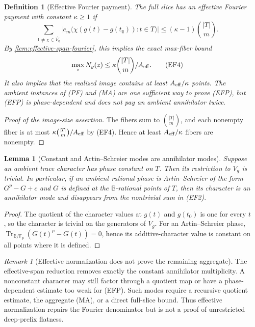 \documentclass[12pt,a4paper]{amsart}
\numberwithin{equation}{section}
\newtheorem{lemma}[lemma]{Lemma}
\newtheorem{definition}[definition]{Definition}
\theoremstyle{remark}
\newtheorem{remark}[remark]{Remark}
\DeclareMathOperator{\Tr}{Tr}
\newcommand{\F}{\mathbb F}
\newcommand{\B}{\mathbb B}
\newcommand{\abs}[1]{\lvert #1\rvert}
\begin{document}
\begin{definition}[Effective Fourier payment]
\label{def:effective-fourier-payment}
The full slice has an \emph{effective Fourier payment with constant
\(\kappa\ge1\)} if
\[
 \sum_{1\ne\chi\in\widehat{V_g}}
 \left|e_m\bigl(\chi(g(t)-g(t_0)):t\in T\bigr)\right|
 \le (\kappa-1)\binom{\abs T}m.                    \tag{EFP}
\]
By \cref{lem:effective-span-fourier}, this implies the exact max-fiber
bound
\[
               \max_zN_g(z)\le
               \kappa\binom{\abs T}m/A_{\rm eff}. \tag{EF4}
\]
It also implies that the realized image contains at least
\(A_{\rm eff}/\kappa\) points.  The ambient instances of \textup{(PF)}
and \textup{(MA)} are one sufficient way to prove \textup{(EFP)}, but
\textup{(EFP)} is phase-dependent and does not pay an ambient annihilator
twice.
\end{definition}

\begin{proof}[Proof of the image-size assertion]
The fibers sum to \(\binom{\abs T}m\), and each nonempty fiber is at most
\(\kappa\binom{\abs T}m/A_{\rm eff}\) by \textup{(EF4)}.
Hence at least \(A_{\rm eff}/\kappa\) fibers are nonempty.
\end{proof}

\begin{lemma}[Constant and Artin--Schreier modes are annihilator modes]
\label{lem:constant-modes-annihilator}
Suppose an ambient trace character has phase constant on \(T\).  Then its
restriction to \(V_g\) is trivial.  In particular, if an ambient rational
phase is Artin--Schreier of the form \(G^p-G+c\) and \(G\) is defined at
the \(\B\)-rational points of \(T\), then its character is an annihilator
mode and disappears from the nontrivial sum in \textup{(EF2)}.
\end{lemma}

\begin{proof}
The quotient of the character values at \(g(t)\) and \(g(t_0)\) is one
for every \(t\), so the character is trivial on the generators of
\(V_g\).  For an Artin--Schreier phase,
\(\Tr_{\B/\F_p}(G(t)^p-G(t))=0\), hence its additive-character value is
constant on all points where it is defined.
\end{proof}

\begin{remark}[Effective normalization does not prove the remaining aggregate]
The effective-span reduction removes exactly the constant annihilator
multiplicity.  A nonconstant character may still factor through a quotient
map or have a phase-dependent estimate too weak for \textup{(EFP)}.  Such
modes require a recursive quotient estimate, the aggregate
\textup{(MA)}, or a direct full-slice bound.  Thus effective normalization
repairs the Fourier denominator but is not a proof of unrestricted deep-prefix
flatness.
\end{remark}
\end{document}
